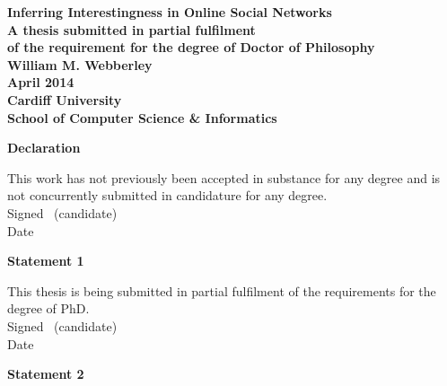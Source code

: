 




\frontmatter

\begin{titlepage}

\begin{center}
\vspace*{3ex}
\textbf{\Huge Inferring Interestingness in Online Social Networks}\\[2ex]
\textbf{\large A thesis submitted in partial fulfilment}\\[1ex]
\textbf{\large of the requirement for the degree of Doctor of Philosophy}\\[16ex]
\textbf{\LARGE William M. Webberley}\\
\vfill
\textbf{\LARGE April 2014}\\
\vfill
\textbf{\LARGE Cardiff University}\\[1ex]
\textbf{\LARGE School of Computer Science \& Informatics}\\[4ex]
\end{center}

\end{titlepage}

\newpage\thispagestyle{empty}\cleardoublepage


\thispagestyle{plain}

\vspace*{6ex}

\textbf{\large Declaration}

This work has not previously been accepted in substance for any degree and is not concurrently submitted in candidature for any degree.\\[2ex]
Signed \dotfill \ (candidate) \hspace*{10em}\\[1ex]
Date\ \ \ \ \ \dotfill \hspace*{18em}

\vfill

\textbf{\large Statement 1}

This thesis is being submitted in partial fulfilment of the requirements for the degree of PhD.\\[2ex]
Signed \dotfill \ (candidate) \hspace*{10em}\\[1ex]
Date\ \ \ \ \ \dotfill \hspace*{18em}

\textbf{\large Statement 2}

